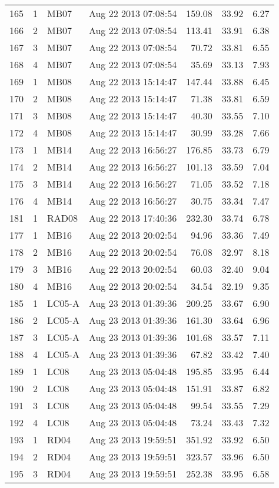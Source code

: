\documentclass{article}
\begin{document}
\begin{longtable}{ccllrrr}
\hline 
165&1&MB07&Aug 22 2013 07:08:54&159.08&33.92&6.27\\
166&2&MB07&Aug 22 2013 07:08:54&113.41&33.91&6.38\\
167&3&MB07&Aug 22 2013 07:08:54&70.72&33.81&6.55\\
168&4&MB07&Aug 22 2013 07:08:54&35.69&33.13&7.93\\
\hline 
169&1&MB08&Aug 22 2013 15:14:47&147.44&33.88&6.45\\
170&2&MB08&Aug 22 2013 15:14:47&71.38&33.81&6.59\\
171&3&MB08&Aug 22 2013 15:14:47&40.30&33.55&7.10\\
172&4&MB08&Aug 22 2013 15:14:47&30.99&33.28&7.66\\
\hline 
173&1&MB14&Aug 22 2013 16:56:27&176.85&33.73&6.79\\
174&2&MB14&Aug 22 2013 16:56:27&101.13&33.59&7.04\\
175&3&MB14&Aug 22 2013 16:56:27&71.05&33.52&7.18\\
176&4&MB14&Aug 22 2013 16:56:27&30.75&33.34&7.47\\
\hline 
181&1&RAD08&Aug 22 2013 17:40:36&232.30&33.74&6.78\\
\hline 
177&1&MB16&Aug 22 2013 20:02:54&94.96&33.36&7.49\\
178&2&MB16&Aug 22 2013 20:02:54&76.08&32.97&8.18\\
179&3&MB16&Aug 22 2013 20:02:54&60.03&32.40&9.04\\
180&4&MB16&Aug 22 2013 20:02:54&34.54&32.19&9.35\\
\hline 
185&1&LC05-A&Aug 23 2013 01:39:36&209.25&33.67&6.90\\
186&2&LC05-A&Aug 23 2013 01:39:36&161.30&33.64&6.96\\
187&3&LC05-A&Aug 23 2013 01:39:36&101.68&33.57&7.11\\
188&4&LC05-A&Aug 23 2013 01:39:36&67.82&33.42&7.40\\
\hline 
189&1&LC08&Aug 23 2013 05:04:48&195.85&33.95&6.44\\
190&2&LC08&Aug 23 2013 05:04:48&151.91&33.87&6.82\\
191&3&LC08&Aug 23 2013 05:04:48&99.54&33.55&7.29\\
192&4&LC08&Aug 23 2013 05:04:48&73.24&33.43&7.32\\
\hline 
193&1&RD04&Aug 23 2013 19:59:51&351.92&33.92&6.50\\
194&2&RD04&Aug 23 2013 19:59:51&323.57&33.96&6.50\\
195&3&RD04&Aug 23 2013 19:59:51&252.38&33.95&6.58\\

\end{longtable}
\end{document}
